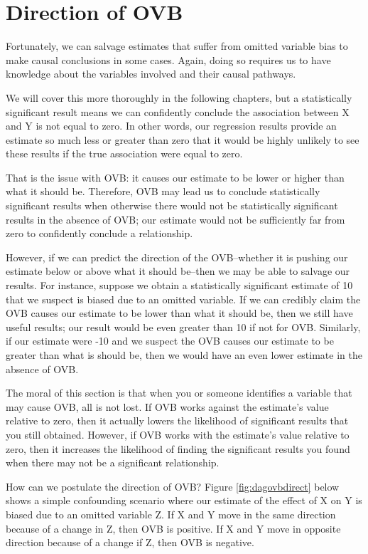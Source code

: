 \documentclass[
]{book}
\begin{document}
\hypertarget{direction-of-ovb}{%
\section{Direction of OVB}\label{direction-of-ovb}}

Fortunately, we can salvage estimates that suffer from omitted variable bias to make causal conclusions in some cases. Again, doing so requires us to have knowledge about the variables involved and their causal pathways.

We will cover this more thoroughly in the following chapters, but a statistically significant result means we can confidently conclude the association between X and Y is not equal to zero. In other words, our regression results provide an estimate so much less or greater than zero that it would be highly unlikely to see these results if the true association were equal to zero.

That is the issue with OVB: it causes our estimate to be lower or higher than what it should be. Therefore, OVB may lead us to conclude statistically significant results when otherwise there would not be statistically significant results in the absence of OVB; our estimate would not be sufficiently far from zero to confidently conclude a relationship.

However, if we can predict the direction of the OVB--whether it is pushing our estimate below or above what it should be--then we may be able to salvage our results. For instance, suppose we obtain a statistically significant estimate of 10 that we suspect is biased due to an omitted variable. If we can credibly claim the OVB causes our estimate to be lower than what it should be, then we still have useful results; our result would be even greater than 10 if not for OVB. Similarly, if our estimate were -10 and we suspect the OVB causes our estimate to be greater than what is should be, then we would have an even lower estimate in the absence of OVB.

The moral of this section is that when you or someone identifies a variable that may cause OVB, all is not lost. If OVB works against the estimate's value relative to zero, then it actually lowers the likelihood of significant results that you still obtained. However, if OVB works with the estimate's value relative to zero, then it increases the likelihood of finding the significant results you found when there may not be a significant relationship.

How can we postulate the direction of OVB? Figure \ref{fig:dagovbdirect} below shows a simple confounding scenario where our estimate of the effect of X on Y is biased due to an omitted variable Z. If X and Y move in the same direction because of a change in Z, then OVB is positive. If X and Y move in opposite direction because of a change if Z, then OVB is negative.
\end{document}
